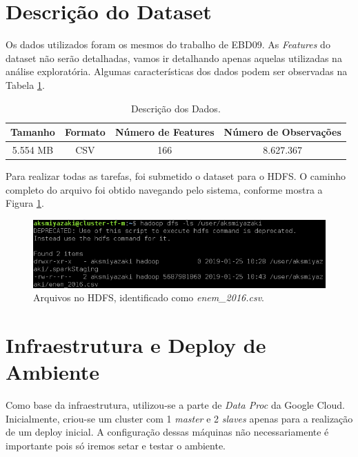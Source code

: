 \documentclass{article}
\begin{document}
\newpage
\section{Descrição do Dataset}
\label{sect:data}

Os dados utilizados foram os mesmos do trabalho de EBD09. As \emph{Features} do dataset não serão detalhadas, vamos ir detalhando apenas aquelas utilizadas na análise exploratória. Algumas características dos dados podem ser observadas na Tabela \ref{tab:data_data}.

\begin{table}[H]
\centering
\begin{tabular}{|c|c|c|c|}
\hline
Tamanho & Formato & Número de Features &  Número de Observações \\ \hline \hline
5.554 MB & CSV & 166 & 8.627.367 \\ \hline
\end{tabular}
\caption{Descrição dos Dados.}
\label{tab:data_data}
\end{table}

Para realizar todas as tarefas, foi submetido o dataset para o HDFS. O caminho completo do arquivo foi obtido navegando pelo sistema, conforme mostra a Figura \ref{fig:data_on_hdfs}.

\begin{figure}[H]
  \includegraphics[width=\linewidth]{img/file_hdfs.png}
  \caption{Arquivos no HDFS, identificado como \emph{enem\_2016.csv}.}
  \label{fig:data_on_hdfs}
\end{figure}

\newpage
\section{Infraestrutura e Deploy de Ambiente}
\label{sect:infra}

Como base da infraestrutura, utilizou-se a parte de \emph{Data Proc} da Google Cloud. Inicialmente, criou-se um cluster com 1 \emph{master} e 2 \emph{slaves} apenas para a realização de um deploy inicial. A configuração dessas máquinas não necessariamente é importante pois só iremos setar e testar o ambiente.
\end{document}
